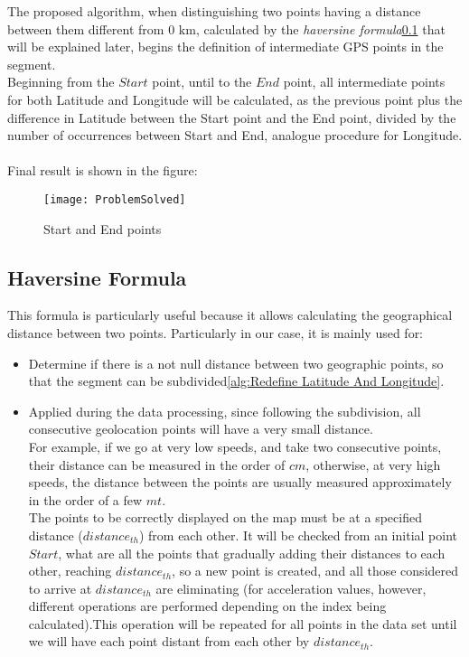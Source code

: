 \documentclass[tesi]{subfiles}
\begin{document}
\noindent The proposed algorithm, when distinguishing two points having a distance between them different from $0$ $\si{\km}$, calculated by the \textit{haversine formula}\ref{ssc:Haversine Formula} that will be explained later, begins the definition of intermediate GPS points in the segment.\\
Beginning from the $Start$ point, until to the $End$ point, all intermediate points for both Latitude and Longitude will be calculated, as the previous point plus the difference in Latitude between the Start point and the End point, divided by the number of occurrences between Start and End, analogue procedure for Longitude.\\\\
Final result is shown in the figure:

\vspace{0.15cm}
\begin{figure}[H]	
\centering
\texttt{[image: ProblemSolved]} \label{Solved GPS Points Problem}
 \caption{Start and End points}
  \label{fig:Solved GPS Points Problem}
\end{figure}
\subsection{Haversine Formula} \label{ssc:Haversine Formula}
This formula is particularly useful because it allows calculating the geographical distance between two points. Particularly in our case, it is mainly used for:
\begin{itemize}
\item Determine if there is a not null distance between two geographic points, so that the segment can be subdivided\ref{alg:Redefine Latitude And Longitude}.
\item Applied during the data processing, since following the subdivision, all consecutive geolocation points will have a very small distance.\\
For example, if we go at very low speeds, and take two consecutive points, their distance can be measured in the order of $cm$, otherwise, at very high speeds, the distance between the points are usually measured approximately in the order of a few $mt$.\\
The points to be correctly displayed on the map must be at a specified distance ($distance_{th}$) from each other.
It will be checked from an initial point $Start$, what are all the points that gradually adding their distances to each other, reaching $distance_{th}$, so a new point is created, and all those considered to arrive at $distance_{th}$ are eliminating (for acceleration values, however, different operations are performed depending on the index being calculated).This operation will be repeated for all points in the data set until we will have each point distant from each other by $distance_{th}$.
\end{itemize}
\end{document}
